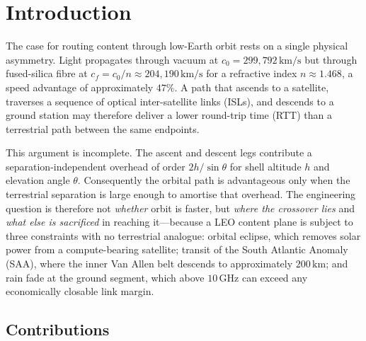 \documentclass[10pt,twocolumn]{article}
\newcommand{\km}{\,\mathrm{km}}
\newcommand{\GHz}{\,\mathrm{GHz}}
\begin{document}
\section{Introduction}

The case for routing content through low-Earth orbit rests on a single physical
asymmetry. Light propagates through vacuum at $c_{0}=299{,}792\km\mathrm{/s}$
but through fused-silica fibre at $c_{f}=c_{0}/n\approx204{,}190\km\mathrm{/s}$
for a refractive index $n\approx1.468$, a speed advantage of approximately
$47\%$. A path that ascends to a satellite, traverses a sequence of optical
inter-satellite links (ISLs), and descends to a ground station may therefore
deliver a lower round-trip time (RTT) than a terrestrial path between the same
endpoints.

This argument is incomplete. The ascent and descent legs contribute a
separation-independent overhead of order $2h/\sin\theta$ for shell altitude $h$
and elevation angle $\theta$. Consequently the orbital path is advantageous only
when the terrestrial separation is large enough to amortise that overhead. The
engineering question is therefore not \emph{whether} orbit is faster, but
\emph{where the crossover lies} and \emph{what else is sacrificed} in reaching
it---because a LEO content plane is subject to three constraints with no
terrestrial analogue: orbital eclipse, which removes solar power from a
compute-bearing satellite; transit of the South Atlantic Anomaly (SAA), where the
inner Van Allen belt descends to approximately $200\km$; and rain fade at the
ground segment, which above $10\GHz$ can exceed any economically closable link
margin.

\subsection{Contributions}
\end{document}
